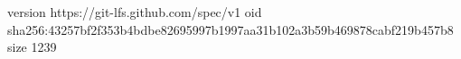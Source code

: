 version https://git-lfs.github.com/spec/v1
oid sha256:43257bf2f353b4bdbe82695997b1997aa31b102a3b59b469878cabf219b457b8
size 1239
